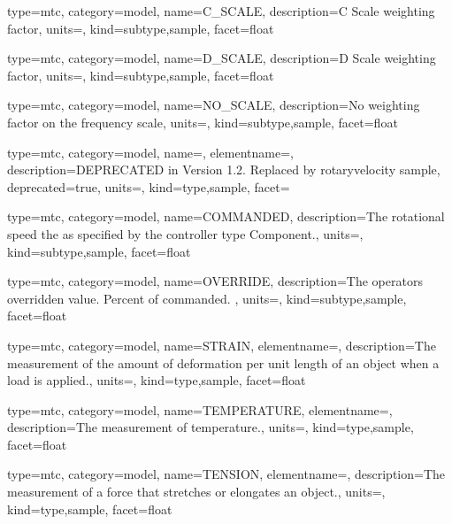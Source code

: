 {
  type=mtc,
  category=model,
  name={C\_SCALE},
  description={C Scale weighting factor},
  units=,
  kind={subtype,sample},
  facet={\gls{float}}
}


{
  type=mtc,
  category=model,
  name={D\_SCALE},
  description={D Scale weighting factor},
  units=,
  kind={subtype,sample},
  facet={\gls{float}}
}


{
  type=mtc,
  category=model,
  name={NO\_SCALE},
  description={No weighting factor on the frequency scale},
  units=,
  kind={subtype,sample},
  facet={\gls{float}}
}


{
  type=mtc,
  category=model,
  name={},
  elementname=,
  description={DEPRECATED in Version 1.2.  Replaced by \gls{rotaryvelocity sample}},
  deprecated={true},
  units={},
  kind={type,sample},
  facet={}
}


{
  type=mtc,
  category=model,
  name={COMMANDED},
  description={The rotational speed the as specified by the \gls{controller} type Component.},
  units=,
  kind={subtype,sample},
  facet={\gls{float}}
}


{
  type=mtc,
  category=model,
  name={OVERRIDE},
  description={The operators overridden value.  Percent of commanded. },
  units=,
  kind={subtype,sample},
  facet={\gls{float}}
}


{
  type=mtc,
  category=model,
  name={STRAIN},
  elementname=,
  description={The measurement of the amount of deformation per unit length of an object when a load is applied.},
  units=,
  kind={type,sample},
  facet={\gls{float}}
}


{
  type=mtc,
  category=model,
  name={TEMPERATURE},
  elementname=,
  description={The measurement of temperature.},
  units=,
  kind={type,sample},
  facet={\gls{float}}
}


{
  type=mtc,
  category=model,
  name={TENSION},
  elementname=,
  description={The measurement of a force that stretches or elongates an object.},
  units=,
  kind={type,sample},
  facet={\gls{float}}
}


